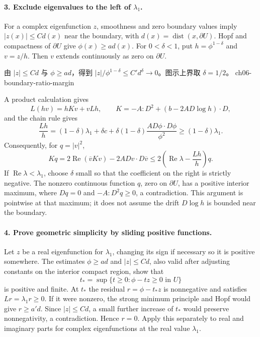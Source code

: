 \begin{expandedproof}
\Needspace{45mm}
\paragraph{3. Exclude eigenvalues to the left of $\lambda_1$.}
For a complex eigenfunction $z$, smoothness and zero boundary values imply
$|z(x)|\leq C d(x)$ near the boundary, with
$d(x)=\operatorname{dist}(x,\partial U)$.
Hopf and compactness of $\partial U$ give $\phi(x)\geq a d(x)$.
For $0<\delta<1$, put $h=\phi^{1-\delta}$ and $v=z/h$.
Then $v$ extends continuously as zero on $\partial U$.

{由 $|z|\leq Cd$ 与 $\phi\geq ad$，得到 $|z|/\phi^{1-\delta}\leq C'd^\delta\to0$。图示上界取 $\delta=1/2$。}
{ch06-boundary-ratio-margin}

A product calculation gives
\[
 L(hv)=hKv+vLh,\qquad
 K=-A:D^2+(b-2AD\log h)\cdot D,
\]
and the chain rule gives
\[
 \frac{Lh}{h}
 =(1-\delta)\lambda_1+\delta c+
 \delta(1-\delta)\frac{A D\phi\cdot D\phi}{\phi^2}
 \geq(1-\delta)\lambda_1.
\]
Consequently, for $q=|v|^2$,
\[
 Kq=2\operatorname{Re}(\overline v Kv)-2A Dv\cdot D\overline v
 \leq2\left(\operatorname{Re}\lambda-\frac{Lh}{h}\right)q .
\]
If $\operatorname{Re}\lambda<\lambda_1$, choose $\delta$ small so that
the coefficient on the right is strictly negative.
The nonzero continuous function $q$, zero on $\partial U$, has a
positive interior maximum, where $Dq=0$ and $-A:D^2q\geq0$,
a contradiction. This argument is pointwise at that maximum; it does
not assume the drift $D\log h$ is bounded near the boundary.

\paragraph{4. Prove geometric simplicity by sliding positive functions.}
Let $z$ be a real eigenfunction for $\lambda_1$, changing its sign if
necessary so it is positive somewhere.
The estimates $\phi\geq a d$ and $|z|\leq C d$, also valid after adjusting
constants on the interior compact region, show that
\[
 t_*=\sup\{t\geq0:\phi-tz\geq0\text{ in }U\}
\]
is positive and finite. At $t_*$ the residual $r=\phi-t_*z$ is nonnegative
and satisfies $Lr=\lambda_1r\geq0$.
If it were nonzero, the strong minimum principle and Hopf would give
$r\geq a' d$. Since $|z|\leq C d$, a small further increase of $t_*$
would preserve nonnegativity, a contradiction.
Hence $r=0$. Apply this separately to real and imaginary parts for
complex eigenfunctions at the real value $\lambda_1$.
\end{expandedproof}


